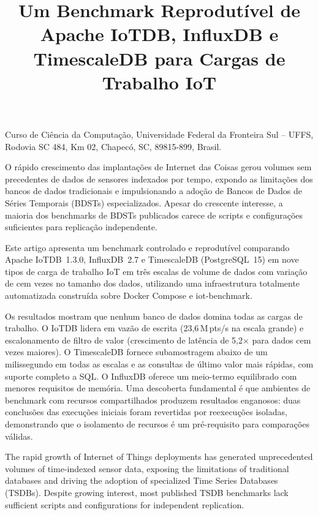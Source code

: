 \documentclass[brazilian]{presets/sbcreviews-2025}%
\title[Um Benchmark Reprodutível de Apache IoTDB, InfluxDB e TimescaleDB para Cargas de Trabalho IoT]{Um Benchmark Reprodutível de Apache IoTDB, InfluxDB e TimescaleDB para Cargas de Trabalho IoT}
\author[Klein 2026]{
  \affil{\textbf{Luiz Fernando Klein}~\orcidlink{0009-0001-8949-3248}~\textcolor{blue}{\faEnvelope}~~[{Universidade Federal da Fronteira Sul - UFFS}~|\href{mailto: ...}{~{\textit{luizkleinfernando@gmail.com}}}~]}
}
\begin{document}
\begin{frontmatter}

  \maketitle

  \begin{mail}
    Curso de Ciência da Computação, Universidade Federal da Fronteira Sul -- UFFS, Rodovia SC 484, Km 02, Chapecó, SC, 89815-899, Brasil.
  \end{mail}

  \begin{abstract-pt}
    O rápido crescimento das implantações de Internet das Coisas gerou volumes sem precedentes de
    dados de sensores indexados por tempo, expondo as limitações dos bancos de dados tradicionais e
    impulsionando a adoção de Bancos de Dados de Séries Temporais (BDSTs) especializados. Apesar do
    crescente interesse, a maioria dos benchmarks de BDSTs publicados carece de scripts e
    configurações suficientes para replicação independente.

    Este artigo apresenta um benchmark controlado e reprodutível comparando Apache IoTDB~1.3.0,
    InfluxDB~2.7 e TimescaleDB (PostgreSQL~15) em nove tipos de carga de trabalho IoT em três
    escalas de volume de dados com variação de cem vezes no tamanho dos dados, utilizando uma
    infraestrutura totalmente automatizada construída sobre Docker Compose e iot-benchmark.

    Os resultados mostram que nenhum banco de dados domina todas as cargas de trabalho. O IoTDB
    lidera em vazão de escrita (23,6\,M\,pts/s na escala grande) e escalonamento de filtro de valor
    (crescimento de latência de 5,2$\times$ para dados cem vezes maiores). O TimescaleDB fornece
    subamostragem abaixo de um milissegundo em todas as escalas e as consultas de último valor mais
    rápidas, com suporte completo a SQL. O InfluxDB oferece um meio-termo equilibrado com menores
    requisitos de memória. Uma descoberta fundamental é que ambientes de benchmark com recursos
    compartilhados produzem resultados enganosos: duas conclusões das execuções iniciais foram
    revertidas por reexecuções isoladas, demonstrando que o isolamento de recursos é um pré-requisito
    para comparações válidas.
  \end{abstract-pt}

  \begin{abstract-en}
    The rapid growth of Internet of Things deployments has generated unprecedented volumes of
    time-indexed sensor data, exposing the limitations of traditional databases and driving the
    adoption of specialized Time Series Databases (TSDBs). Despite growing interest, most published
    TSDB benchmarks lack sufficient scripts and configurations for independent replication.


\end{abstract-en}
\end{frontmatter}
\end{document}
